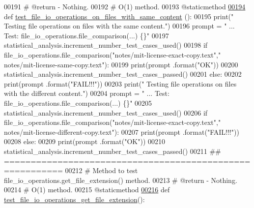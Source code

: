\begin{DoxyCode}
00191     \textcolor{comment}{#   @return - Nothing.}
00192     \textcolor{comment}{#   O(1) method.}
00193     @staticmethod
\hypertarget{file__io__tester_8py_source_l00194}{}\hyperlink{classutilities_1_1file__io__tester_1_1file__io__operations__tester_a5efc5f988841df586d1db5619d5fe49e}{00194}     \textcolor{keyword}{def }\hyperlink{classutilities_1_1file__io__tester_1_1file__io__operations__tester_a5efc5f988841df586d1db5619d5fe49e}{test\_file\_io\_operations\_on\_files\_with\_same\_content}
      ():
00195         print(\textcolor{stringliteral}{" Testing file operations on files with the same content."})
00196         prompt = \textcolor{stringliteral}{"  ... Test: file\_io\_operations.file\_comparison(...)   \{\}"}
00197         statistical\_analysis.increment\_number\_test\_cases\_used()
00198         \textcolor{keywordflow}{if} file\_io\_operations.file\_comparison(\textcolor{stringliteral}{"notes/mit-license-exact-copy.text"},\textcolor{stringliteral}{"
      notes/mit-license-same-copy.text"}):
00199             print(prompt .format(\textcolor{stringliteral}{"OK"}))
00200             statistical\_analysis.increment\_number\_test\_cases\_passed()
00201         \textcolor{keywordflow}{else}:
00202             print(prompt .format(\textcolor{stringliteral}{"FAIL!!!"}))
00203         print(\textcolor{stringliteral}{" Testing file operations on files with the different content."})
00204         prompt = \textcolor{stringliteral}{"  ... Test: file\_io\_operations.file\_comparison(...)   \{\}"}
00205         statistical\_analysis.increment\_number\_test\_cases\_used()
00206         \textcolor{keywordflow}{if} file\_io\_operations.file\_comparison(\textcolor{stringliteral}{"notes/mit-license-exact-copy.text"},\textcolor{stringliteral}{"
      notes/mit-license-different-copy.text"}):
00207             print(prompt .format(\textcolor{stringliteral}{"FAIL!!!"}))
00208         \textcolor{keywordflow}{else}:
00209             print(prompt .format(\textcolor{stringliteral}{"OK"}))
00210             statistical\_analysis.increment\_number\_test\_cases\_passed()
00211     \textcolor{comment}{## =========================================================}
00212     \textcolor{comment}{#   Method to test file\_io\_operations.get\_file\_extension() method.}
00213     \textcolor{comment}{#   @return - Nothing.}
00214     \textcolor{comment}{#   O(1) method.}
00215     @staticmethod
\hypertarget{file__io__tester_8py_source_l00216}{}\hyperlink{classutilities_1_1file__io__tester_1_1file__io__operations__tester_a264a387fe5693619617b8b10be1354af}{00216}     \textcolor{keyword}{def }\hyperlink{classutilities_1_1file__io__tester_1_1file__io__operations__tester_a264a387fe5693619617b8b10be1354af}{test\_file\_io\_operations\_get\_file\_extension}():

\end{DoxyCode}
